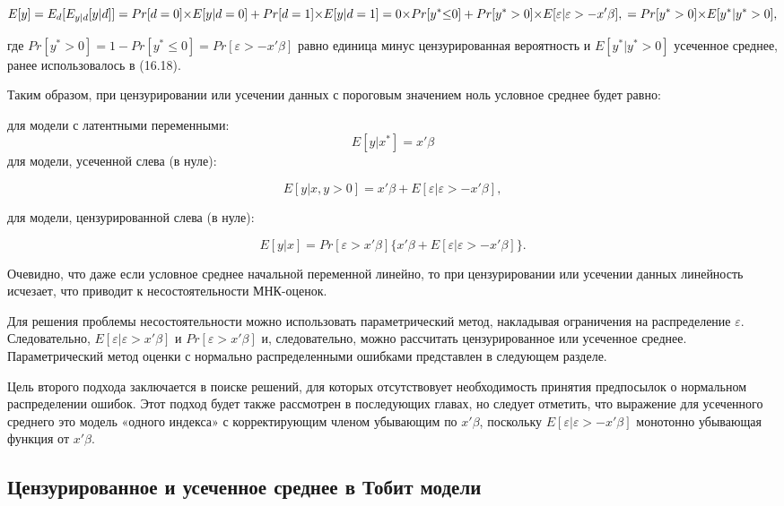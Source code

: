 \begin{equation}
E[y]=E_{d}[E_{y|d}[y|d]] \\
=Pr[d=0]{\times}E[y|d=0]+Pr[d=1]{\times}E[y|d=1]\\
=0{\times}Pr[y^{*}{\leq}0]+Pr[y^{*}>0]{\times}E[\varepsilon|\varepsilon>-x'\beta],\\
=Pr[y^{*}>0]{\times}E[y^{*}|y^{*}>0],
\end{equation}

где $Pr[y^{*}>0]=1-Pr[y^{*}{\leq}0]=Pr[\varepsilon>-x'\beta]$ равно единица минус цензурированная вероятность и $E[y^{*}|y^{*}>0]$ усеченное среднее, ранее использовалось в (16.18).

Таким образом, при цензурировании или усечении данных с пороговым значением ноль условное среднее будет равно:

для модели с латентными переменными: \[E[y|x^{*}]=x'\beta\]
для модели, усеченной слева (в нуле):

\begin{equation}
E[y|x,y>0]=x'\beta+E[\varepsilon|\varepsilon>-x'\beta],
\end{equation}

для модели, цензурированной слева (в нуле): 

\[
E[y|x]=Pr[{\varepsilon}>x'\beta]\lbrace{x'\beta+E[\varepsilon|\varepsilon>{-x}'\beta]}\rbrace.
\]

Очевидно, что даже если условное среднее начальной переменной линейно, то при цензурировании или усечении данных линейность исчезает, что приводит к несостоятельности МНК-оценок.

Для решения проблемы несостоятельности можно использовать параметрический метод, накладывая ограничения на распределение $\varepsilon$. Следовательно, $E[\varepsilon|\varepsilon>x'\beta]$ и $Pr[\varepsilon>x'\beta]$ и, следовательно, можно рассчитать цензурированное или усеченное среднее. Параметрический метод оценки с нормально распределенными ошибками представлен в следующем разделе.

Цель второго подхода заключается в поиске решений, для которых отсутствовует необходимость принятия предпосылок о нормальном распределении ошибок. Этот подход будет также рассмотрен в последующих главах, но следует отметить, что выражение для усеченного среднего это модель «одного индекса» с корректирующим членом убывающим по $x'\beta$, поскольку $E[\varepsilon|\varepsilon>-x'\beta]$ монотонно убывающая функция от $x'\beta$.

\subsection{Цензурированное и усеченное среднее в Тобит модели}

